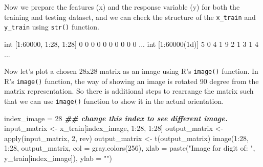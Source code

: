 \documentclass[
  12pt,
]{krantz}
\makeatletter
\newenvironment{Shaded}{\begin{snugshade}}{\end{snugshade}}
\newcommand{\AttributeTok}[1]{\textcolor[rgb]{0.61,0.61,0.61}{#1}}
\newcommand{\DecValTok}[1]{\textcolor[rgb]{0.06,0.06,0.06}{#1}}
\newcommand{\DocumentationTok}[1]{\textcolor[rgb]{0.37,0.37,0.37}{\textbf{\textit{#1}}}}
\newcommand{\FunctionTok}[1]{\textcolor[rgb]{0,0,0}{#1}}
\newcommand{\NormalTok}[1]{#1}
\newcommand{\OtherTok}[1]{\textcolor[rgb]{0.37,0.37,0.37}{#1}}
\newcommand{\SpecialCharTok}[1]{\textcolor[rgb]{0,0,0}{#1}}
\newcommand{\StringTok}[1]{\textcolor[rgb]{0.5,0.5,0.5}{#1}}
\newenvironment{kframe}{%
\medskip{}
\setlength{\fboxsep}{.8em}
 \def\at@end@of@kframe{}%
 \ifinner\ifhmode%
  \def\at@end@of@kframe{\end{minipage}}%
  \begin{minipage}{\columnwidth}%
 \fi\fi%
 \def\FrameCommand##1{\hskip\@totalleftmargin \hskip-\fboxsep
 \colorbox{shadecolor}{##1}\hskip-\fboxsep
     \hskip-\linewidth \hskip-\@totalleftmargin \hskip\columnwidth}%
 \MakeFramed {\advance\hsize-\width
   \@totalleftmargin\z@ \linewidth\hsize
   \@setminipage}}%
 {\par\unskip\endMakeFramed%
 \at@end@of@kframe}
\renewenvironment{Shaded}{\begin{kframe}}{\end{kframe}}
\makeatother
\begin{document}
Now we prepare the features (x) and the response variable (y) for both the training and testing dataset, and we can check the structure of the \texttt{x\_train} and \texttt{y\_train} using \texttt{str()} function.

\begin{Shaded}
\end{Shaded}

\begin{Shaded}
\begin{Highlighting}[]
\NormalTok{int [1:60000, 1:28, 1:28] 0 0 0 0 0 0 0 0 0 0 ...}
\NormalTok{int [1:60000(1d)] 5 0 4 1 9 2 1 3 1 4 ...}
\end{Highlighting}
\end{Shaded}

Now let's plot a chosen 28x28 matrix as an image using R's \texttt{image()} function. In R's \texttt{image()} function, the way of showing an image is rotated 90 degree from the matrix representation. So there is additional steps to rearrange the matrix such that we can use \texttt{image()} function to show it in the actual orientation.

\begin{Shaded}
\begin{Highlighting}[]
\NormalTok{index\_image }\OtherTok{=} \DecValTok{28}  \DocumentationTok{\#\# change this index to see different image.}
\NormalTok{input\_matrix }\OtherTok{\textless{}{-}}\NormalTok{ x\_train[index\_image, }\DecValTok{1}\SpecialCharTok{:}\DecValTok{28}\NormalTok{, }\DecValTok{1}\SpecialCharTok{:}\DecValTok{28}\NormalTok{]}
\NormalTok{output\_matrix }\OtherTok{\textless{}{-}} \FunctionTok{apply}\NormalTok{(input\_matrix, }\DecValTok{2}\NormalTok{, rev)}
\NormalTok{output\_matrix }\OtherTok{\textless{}{-}} \FunctionTok{t}\NormalTok{(output\_matrix)}
\FunctionTok{image}\NormalTok{(}\DecValTok{1}\SpecialCharTok{:}\DecValTok{28}\NormalTok{, }\DecValTok{1}\SpecialCharTok{:}\DecValTok{28}\NormalTok{, output\_matrix, }\AttributeTok{col =} \FunctionTok{gray.colors}\NormalTok{(}\DecValTok{256}\NormalTok{),}
    \AttributeTok{xlab =} \FunctionTok{paste}\NormalTok{(}\StringTok{"Image for digit of: "}\NormalTok{, y\_train[index\_image]),}
    \AttributeTok{ylab =} \StringTok{""}\NormalTok{)}
\end{Highlighting}
\end{Shaded}
\end{document}

